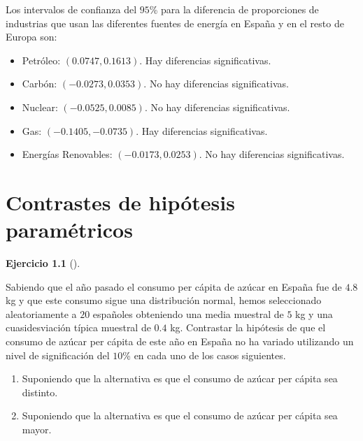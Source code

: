 \documentclass[
  spanish,
  a4paper,
]{scrreport}
\providecommand{\tightlist}{%
  \setlength{\itemsep}{0pt}\setlength{\parskip}{0pt}}
\theoremstyle{definition}
\newtheorem{exercise}{Ejercicio}[chapter]
\theoremstyle{remark}
\begin{document}
\begin{tcolorbox}[enhanced jigsaw, arc=.35mm, bottomrule=.15mm, bottomtitle=1mm, breakable, colback=white, colbacktitle=quarto-callout-tip-color!10!white, colframe=quarto-callout-tip-color-frame, coltitle=black, left=2mm, leftrule=.75mm, opacityback=0, opacitybacktitle=0.6, rightrule=.15mm, title=\textcolor{quarto-callout-tip-color}{\faLightbulb}\hspace{0.5em}{Solución}, titlerule=0mm, toprule=.15mm, toptitle=1mm]

Los intervalos de confianza del \(95\)\% para la diferencia de
proporciones de industrias que usan las diferentes fuentes de energía en
España y en el resto de Europa son:

\begin{itemize}
\tightlist
\item
  Petróleo: \((0.0747, 0.1613)\). Hay diferencias significativas.
\item
  Carbón: \((-0.0273, 0.0353)\). No hay diferencias significativas.
\item
  Nuclear: \((-0.0525, 0.0085)\). No hay diferencias significativas.
\item
  Gas: \((-0.1405, -0.0735)\). Hay diferencias significativas.
\item
  Energías Renovables: \((-0.0173, 0.0253)\). No hay diferencias
  significativas.
\end{itemize}

\end{tcolorbox}


\chapter{Contrastes de hipótesis
paramétricos}\label{contrastes-de-hipuxf3tesis-paramuxe9tricos}

\begin{exercise}[]\protect\hypertarget{exr-contraste-media-consumo-azucar}{}\label{exr-contraste-media-consumo-azucar}

Sabiendo que el año pasado el consumo per cápita de azúcar en España fue
de \(4.8\) kg y que este consumo sigue una distribución normal, hemos
seleccionado aleatoriamente a \(20\) españoles obteniendo una media
muestral de \(5\) kg y una cuasidesviación típica muestral de \(0.4\)
kg. Contrastar la hipótesis de que el consumo de azúcar per cápita de
este año en España no ha variado utilizando un nivel de significación
del \(10\)\% en cada uno de los casos siguientes.

\begin{enumerate}
\def\labelenumi{\alph{enumi}.}
\item
  Suponiendo que la alternativa es que el consumo de azúcar per cápita
  sea distinto.
\item
  Suponiendo que la alternativa es que el consumo de azúcar per cápita
  sea mayor.
\end{enumerate}

\end{exercise}
\end{document}
